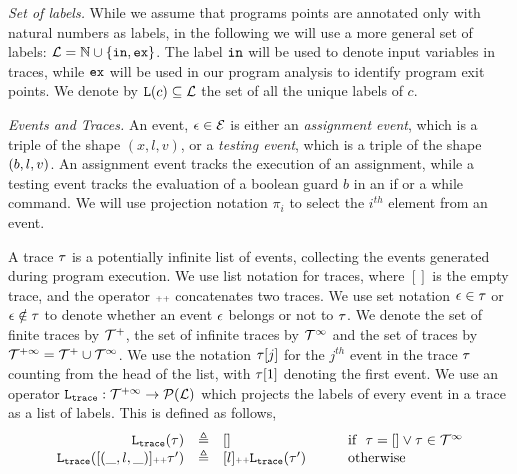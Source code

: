 \noindent\emph{Set of labels.} While we assume that programs points are annotated only with natural numbers as labels, in the following we will use a more general set of labels: $\mathcal{L} = \mathbb{N}\cup\{\mathtt{in},\mathtt{ex}\}$. The label $\mathtt{in}$ will be used to denote input variables in traces, while $\mathtt{ex}$ will be used in our program analysis to identify program exit points.
We denote by  $\mathtt{L}(c) \subseteq \mathcal{L}$ the set of all the unique labels of $c$.





\noindent\emph{Events and Traces.} 
An event, $\mathtt{\epsilon} \in \mathcal{E}$ is either an \emph{assignment event}, which is  a triple of the shape $({x}, l,v)$, or a \emph{testing event}, which is a triple of the shape $(b, l, v)$. An assignment event tracks the execution of an assignment, while a testing event tracks the evaluation
of a boolean guard $b$ in an if or a while command.
We will use projection notation $\pi_i$ to select the $i^{th}$ element
from an event.


A trace $\mathtt{\tau}$ is a potentially infinite list of events, 
collecting the events generated  during program execution. 
We use list notation for traces, where $[]$ is the empty trace, and
the operator ${\scriptscriptstyle ++}$ concatenates two traces. We use set notation $\mathtt{\epsilon} \in \mathtt{\tau}$ or $\mathtt{\epsilon} \notin \mathtt{\tau}$ to denote whether an event $\mathtt{\epsilon}$ belongs or not to $\mathtt{\tau}$.
We denote the set of finite traces by $\mathcal{T}^{+}$, the set of infinite traces by $\mathcal{T}^{\infty}$ and the set of traces by $\mathcal{T}^{+\infty} = \mathcal{T}^{+} \cup \mathcal{T}^{\infty}$.
We use the notation $\mathtt{\tau}[j]$ for the $j^{th}$ event in the trace $\mathtt{\tau}$ counting from the head of the list, with $\mathtt{\tau}[1]$ denoting the first event.
We use an operator $\mathtt{L}_{\mathtt{{trace}}}: \mathcal{T}^{+\infty} \to \mathcal{P}{(\mathcal{L})}$ which projects the labels of every event in a trace as a list of labels. This is defined as follows,
\[
\begin{array}{rcll}
\mathtt{L}_{\mathtt{{trace}}}(\mathtt{\tau}) &\triangleq & [] &\qquad  \mbox{if}~~ \mathtt{\tau} = [] \lor \mathtt{\tau} \in \mathcal{T}^{\infty}
\\ 
\mathtt{L}_{\mathtt{{trace}}}([(\_, l, \_)] {\scriptscriptstyle ++} \mathtt{\tau}') &\triangleq & [l] {\scriptscriptstyle ++} \mathtt{L}_{\mathtt{{trace}}}(\mathtt{\tau}') &\qquad  \mbox{otherwise}
\end{array}
\]

